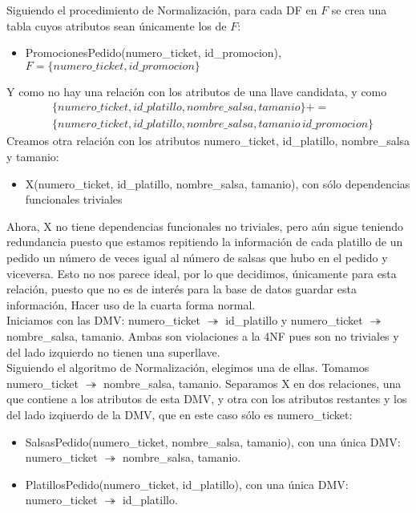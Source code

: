 \documentclass[11pt]{article}
\begin{document}
\begin{itemize}
      Siguiendo el procedimiento de Normalización, para cada DF en $F$ se crea una tabla cuyos atributos sean únicamente los de $F$:
      \begin{itemize}
      \item PromocionesPedido(numero\_ticket, id\_promocion), $F = \{numero\_ticket, id\_promocion\}$
      \end{itemize}
      Y como no hay una relación con los atributos de una llave candidata, y como 
      \begin{align*}      
      &\{numero\_ticket, id\_platillo, nombre\_salsa, tamanio\}+=\\
      &\{numero\_ticket, id\_platillo, nombre\_salsa, tamanio\, id\_promocion\}
      \end{align*}
      Creamos otra relación con los atributos numero\_ticket, id\_platillo, nombre\_salsa y tamanio:
      \begin{itemize}
      \item X(numero\_ticket, id\_platillo, nombre\_salsa, tamanio), con sólo dependencias funcionales triviales
      \end{itemize}
      Ahora, X no tiene dependencias funcionales no triviales, pero aún sigue teniendo redundancia puesto que estamos repitiendo la información de cada platillo de un pedido un número de veces igual al número de salsas que hubo en el pedido y viceversa. Esto no nos parece ideal, por lo que decidimos, únicamente para esta relación, puesto que no es de interés para la base de datos guardar esta información, Hacer uso de la cuarta forma normal.\\
      Iniciamos con las DMV: numero\_ticket $\twoheadrightarrow$ id\_platillo y numero\_ticket $\twoheadrightarrow$ nombre\_salsa, tamanio. Ambas son violaciones a la 4NF pues son no triviales y del lado izquierdo no tienen una superllave.\\
      Siguiendo el algoritmo de Normalización, elegimos una de ellas. Tomamos numero\_ticket $\twoheadrightarrow$ nombre\_salsa, tamanio. Separamos X en dos relaciones, una que contiene a los atributos de esta DMV, y otra con los atributos restantes y los del lado izqiuerdo de la DMV, que en este caso sólo es numero\_ticket:
      \begin{itemize}
      \item SalsasPedido(numero\_ticket, nombre\_salsa, tamanio), con una única DMV: numero\_ticket $\twoheadrightarrow$ nombre\_salsa, tamanio.
      \item PlatillosPedido(numero\_ticket, id\_platillo), con una única DMV: numero\_ticket $\twoheadrightarrow$ id\_platillo.

\end{itemize}
\end{itemize}
\end{document}
